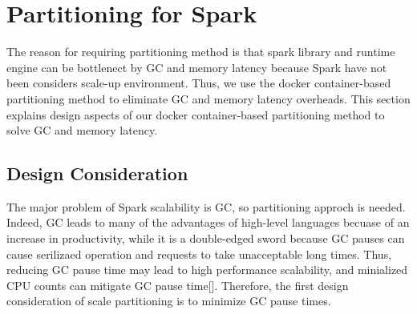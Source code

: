 \section{Partitioning for Spark}

The reason for requiring partitioning method is that
spark library and runtime engine can be bottlenect by GC and memory latency
because Spark have not been considers scale-up environment.
Thus, we use the docker container-based partitioning method to eliminate GC and
memory latency overheads. 
This section explains design aspects of our docker container-based
partitioning method to solve GC and memory latency.

\subsection{Design Consideration}

\ifkor
The major problem of Spark scalability is GC, so partitioning approch is needed.
Indeed, GC leads to many of the advantages of high-level languages becuase of
an increase in productivity, while it is a double-edged sword because
GC pauses can cause serilizaed operation and requests to take unacceptable long
times.
Thus, reducing GC pause time may lead to high performance scalability,
and minialized CPU counts can mitigate GC pause time[].
Therefore, the first design consideration of scale partitioning is to minimize GC
pause times.
\else

\fi

